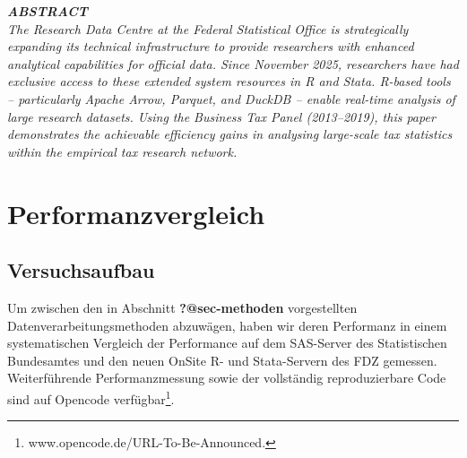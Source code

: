 \documentclass[
  german,
  10pt,
  twoside]{article}
\renewcommand*\contentsname{Inhaltsverzeichnis}
\newcommand\contentsname{Inhaltsverzeichnis}
\begin{document}
\begin{titlepage}
\begin{minipage}[t]{11.8cm}
\vspace{0.3cm}

{\itshape\color{wistaDarkGray}\bfseries\MakeUppercase{Abstract}}\\[0.15cm]
\small\itshape
The Research Data Centre at the Federal Statistical Office is strategically expanding its technical infrastructure to provide researchers with enhanced analytical capabilities for official data. Since November 2025, researchers have had exclusive access to these extended system resources in R and Stata. R-based tools -- particularly Apache Arrow, Parquet, and DuckDB -- enable real-time analysis of large research datasets. Using the Business Tax Panel (2013--2019), this paper demonstrates the achievable efficiency gains in analysing large-scale tax statistics within the empirical tax research network.

\end{minipage}

\vfill

\vspace{0.5cm}
\noindent{}

\end{titlepage}

\pagestyle{fancy}

\renewcommand*\contentsname{Inhaltsverzeichnis}
{
\hypersetup{linkcolor=}
\setcounter{tocdepth}{3}
\tableofcontents
}

\section{Performanzvergleich}\label{sec-performance}

\subsection{Versuchsaufbau}\label{versuchsaufbau}

Um zwischen den in Abschnitt \textbf{?@sec-methoden} vorgestellten
Datenverarbeitungsmethoden abzuwägen, haben wir deren Performanz in
einem systematischen Vergleich der Performance auf dem SAS-Server des
Statistischen Bundesamtes und den neuen OnSite R- und Stata-Servern des
FDZ gemessen. Weiterführende Performanzmessung sowie der vollständig
reproduzierbare Code sind auf Opencode verfügbar\footnote{www.opencode.de/URL-To-Be-Announced.}.
\end{document}
